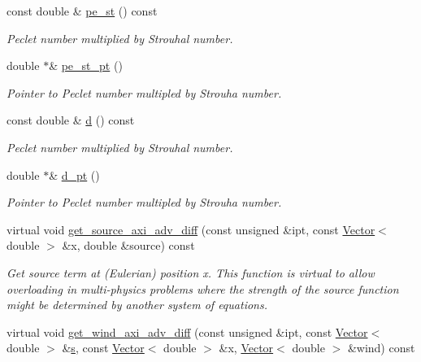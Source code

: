\begin{DoxyCompactItemize}
const double \& \hyperlink{classoomph_1_1AxisymAdvectionDiffusionEquations_af1431215d3df6c1299e0e3f34504b423}{pe\+\_\+st} () const
\begin{DoxyCompactList}\small\item\em Peclet number multiplied by Strouhal number. \end{DoxyCompactList}\item 
double $\ast$\& \hyperlink{classoomph_1_1AxisymAdvectionDiffusionEquations_aaa4a657d824e300f7509f5f0f954c30f}{pe\+\_\+st\+\_\+pt} ()
\begin{DoxyCompactList}\small\item\em Pointer to Peclet number multipled by Strouha number. \end{DoxyCompactList}\item 
const double \& \hyperlink{classoomph_1_1AxisymAdvectionDiffusionEquations_a986c66e2d8e39d56e79633c905cf6833}{d} () const
\begin{DoxyCompactList}\small\item\em Peclet number multiplied by Strouhal number. \end{DoxyCompactList}\item 
double $\ast$\& \hyperlink{classoomph_1_1AxisymAdvectionDiffusionEquations_a06ebb3defb017029d98fdff300cef261}{d\+\_\+pt} ()
\begin{DoxyCompactList}\small\item\em Pointer to Peclet number multipled by Strouha number. \end{DoxyCompactList}\item 
virtual void \hyperlink{classoomph_1_1AxisymAdvectionDiffusionEquations_ac1e5dd8bfd42847320137152e3bd3e41}{get\+\_\+source\+\_\+axi\+\_\+adv\+\_\+diff} (const unsigned \&ipt, const \hyperlink{classoomph_1_1Vector}{Vector}$<$ double $>$ \&x, double \&source) const
\begin{DoxyCompactList}\small\item\em Get source term at (Eulerian) position x. This function is virtual to allow overloading in multi-\/physics problems where the strength of the source function might be determined by another system of equations. \end{DoxyCompactList}\item 
virtual void \hyperlink{classoomph_1_1AxisymAdvectionDiffusionEquations_a5572befdf0d7410e7443dc44c4440595}{get\+\_\+wind\+\_\+axi\+\_\+adv\+\_\+diff} (const unsigned \&ipt, const \hyperlink{classoomph_1_1Vector}{Vector}$<$ double $>$ \&\hyperlink{cfortran_8h_ab7123126e4885ef647dd9c6e3807a21c}{s}, const \hyperlink{classoomph_1_1Vector}{Vector}$<$ double $>$ \&x, \hyperlink{classoomph_1_1Vector}{Vector}$<$ double $>$ \&wind) const

\end{DoxyCompactItemize}
